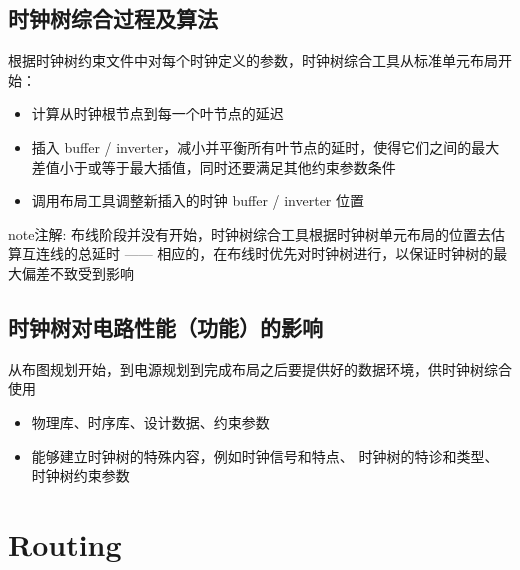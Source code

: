 \documentclass[letterpaper,10pt,english]{sphinxmanual}
\begin{document}
\section{时钟树综合过程及算法}
\label{\detokenize{chapter7/_u65f6_u949f_u6811_u7efc_u5408_u8fc7_u7a0b_u53ca_u7b97_u6cd5:id1}}\label{\detokenize{chapter7/_u65f6_u949f_u6811_u7efc_u5408_u8fc7_u7a0b_u53ca_u7b97_u6cd5::doc}}
\sphinxAtStartPar
根据时钟树约束文件中对每个时钟定义的参数，时钟树综合工具从标准单元布局开始：
\begin{itemize}
\item {} 
\sphinxAtStartPar
计算从时钟根节点到每一个叶节点的延迟

\item {} 
\sphinxAtStartPar
插入 buffer / inverter，减小并平衡所有叶节点的延时，使得它们之间的最大差值小于或等于最大插值，同时还要满足其他约束参数条件

\item {} 
\sphinxAtStartPar
调用布局工具调整新插入的时钟 buffer / inverter 位置

\end{itemize}

\begin{sphinxadmonition}{note}{注解:}
\sphinxAtStartPar
布线阶段并没有开始，时钟树综合工具根据时钟树单元布局的位置去估算互连线的总延时 —— 相应的，在布线时优先对时钟树进行，以保证时钟树的最大偏差不致受到影响
\end{sphinxadmonition}


\section{时钟树对电路性能（功能）的影响}
\label{\detokenize{chapter7/_u65f6_u949f_u6811_u5bf9_u7535_u8def_u6027_u80fd_uff08_u529f_u80fd_uff09_u7684_u5f71_u54cd:id1}}\label{\detokenize{chapter7/_u65f6_u949f_u6811_u5bf9_u7535_u8def_u6027_u80fd_uff08_u529f_u80fd_uff09_u7684_u5f71_u54cd::doc}}
\sphinxAtStartPar
从布图规划开始，到电源规划到完成布局之后要提供好的数据环境，供时钟树综合使用
\begin{itemize}
\item {} 
\sphinxAtStartPar
物理库、时序库、设计数据、约束参数

\item {} 
\sphinxAtStartPar
能够建立时钟树的特殊内容，例如时钟信号和特点、 时钟树的特诊和类型、时钟树约束参数

\end{itemize}


\chapter{Routing}
\label{\detokenize{chapter8/index:routing}}\label{\detokenize{chapter8/index::doc}}
\end{document}
